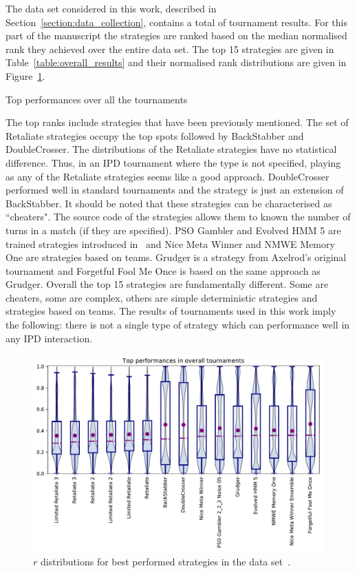 \documentclass{article}
\newcommand{\numberofalltournaments}{}
\begin{document}
The data set considered in this work, described in
Section~\ref{section:data_collection}, contains a total of \numberofalltournaments
tournament results. For this part of the manuscript the strategies are ranked
based on the median normalised rank they achieved over the entire data set.
The top 15 strategies are given in Table~\ref{table:overall_results}
and their normalised rank distributions are given in Figure~\ref{fig:overall_results}.

\begin{table}[!htbp]
    \centering
    \resizebox{.35\textwidth}{!}{
    }
    \caption{Top performances over all the tournaments}\label{table:overall_results}
\end{table}

The top ranks include strategies that have been previously mentioned. The
set of Retaliate strategies occupy the top spots followed by BackStabber
and DoubleCrosser. The distributions of the Retaliate strategies have no
statistical difference. Thus, in an IPD tournament where the type is not
specified, playing as any of the Retaliate strategies seems like a good approach.
DoubleCrosser performed well in standard tournaments and the
strategy is just an extension of BackStabber. It should be noted that these
strategies can be characterised as ``cheaters". The source code of the strategies
allows them to known the number of turns in a match (if they are specified).
PSO Gambler and Evolved HMM 5 are
trained strategies introduced in~\cite{Harper2017} and Nice Meta Winner and NMWE
Memory One are strategies based on teams. Grudger is a strategy from Axelrod's
original tournament and Forgetful Fool Me Once is based on the same approach as
Grudger. Overall the top 15 strategies are fundamentally different. Some are cheaters,
some are complex, others are simple deterministic strategies and strategies based
on teams. The results of \numberofalltournaments tournaments used in this work imply the following:
there is not a single type of strategy which can performance well in any IPD interaction.

\begin{figure}[!htbp]
    \centering
    \includegraphics[width=.7\textwidth]{../images/performance_merged.pdf}
    \caption{\(r\) distributions for best performed strategies in the data set~\cite{data}.}
    \label{fig:overall_results}
\end{figure}
\end{document}
